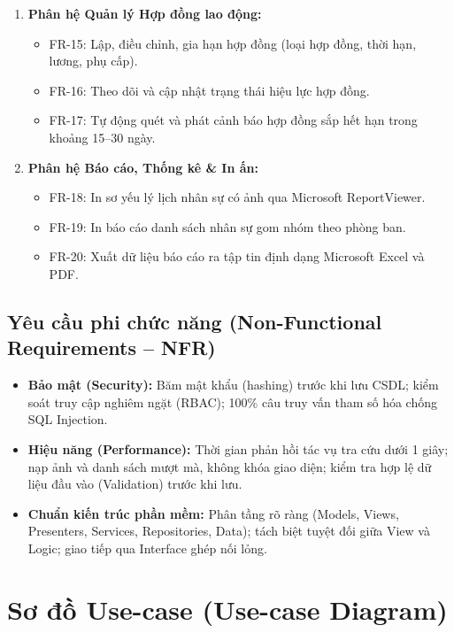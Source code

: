\documentclass[12pt,a4paper]{report}
\begin{document}
\begin{enumerate}[leftmargin=1.0cm]
\begin{itemize}
    \end{itemize}
    \item \textbf{Phân hệ Quản lý Hợp đồng lao động:}
    \begin{itemize}
        \item FR-15: Lập, điều chỉnh, gia hạn hợp đồng (loại hợp đồng, thời hạn, lương, phụ cấp).
        \item FR-16: Theo dõi và cập nhật trạng thái hiệu lực hợp đồng.
        \item FR-17: Tự động quét và phát cảnh báo hợp đồng sắp hết hạn trong khoảng 15--30 ngày.
    \end{itemize}
    \item \textbf{Phân hệ Báo cáo, Thống kê \& In ấn:}
    \begin{itemize}
        \item FR-18: In sơ yếu lý lịch nhân sự có ảnh qua Microsoft ReportViewer.
        \item FR-19: In báo cáo danh sách nhân sự gom nhóm theo phòng ban.
        \item FR-20: Xuất dữ liệu báo cáo ra tập tin định dạng Microsoft Excel và PDF.
    \end{itemize}
\end{enumerate}

\subsection{Yêu cầu phi chức năng (Non-Functional Requirements -- NFR)}
\begin{itemize}[leftmargin=1.0cm]
    \item \textbf{Bảo mật (Security):} Băm mật khẩu (hashing) trước khi lưu CSDL; kiểm soát truy cập nghiêm ngặt (RBAC); 100\% câu truy vấn tham số hóa chống SQL Injection.
    \item \textbf{Hiệu năng (Performance):} Thời gian phản hồi tác vụ tra cứu dưới 1 giây; nạp ảnh và danh sách mượt mà, không khóa giao diện; kiểm tra hợp lệ dữ liệu đầu vào (Validation) trước khi lưu.
    \item \textbf{Chuẩn kiến trúc phần mềm:} Phân tầng rõ ràng (Models, Views, Presenters, Services, Repositories, Data); tách biệt tuyệt đối giữa View và Logic; giao tiếp qua Interface ghép nối lỏng.
\end{itemize}

\section{Sơ đồ Use-case (Use-case Diagram)}
\end{document}
